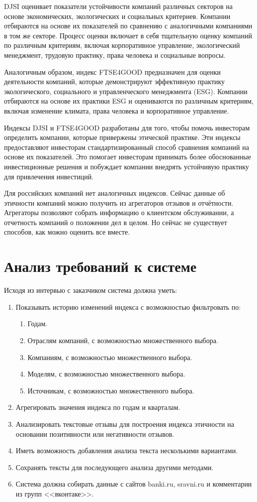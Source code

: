 \documentclass[PI, VKR]{HSEUniversity}
\begin{document}
DJSI оценивает показатели устойчивости компаний различных секторов на основе экономических, экологических и социальных критериев. Компании отбираются на основе их показателей по сравнению с аналогичными компаниями в том же секторе. Процесс оценки включает в себя тщательную оценку компаний по различным критериям, включая корпоративное управление, экологический менеджмент, трудовую практику, права человека и социальные вопросы.

Аналогичным образом, индекс FTSE4GOOD предназначен для оценки деятельности компаний, которые демонстрируют эффективную практику экологического, социального и управленческого менеджмента (ESG). Компании отбираются на основе их практики ESG и оцениваются по различным критериям, включая изменение климата, права человека и корпоративное управление.

Индексы DJSI и FTSE4GOOD разработаны для того, чтобы помочь инвесторам определить компании, которые привержены этической практике. Эти индексы предоставляют инвесторам стандартизированный способ сравнения компаний на основе их показателей. Это помогает инвесторам принимать более обоснованные инвестиционные решения и побуждает компании внедрять устойчивую практику для привлечения инвестиций.

Для российских компаний нет аналогичных индексов. Сейчас данные об этичности компаний можно получить из агрегаторов отзывов и отчётности. Агрегаторы позволяют собрать информацию о клиентском обслуживании, а отчетность компаний о положении дел в целом. Но сейчас не существует способов, как можно оценить все вместе.
\section{Анализ требований к системе}
\label{sec:org003abdc}
Исходя из интервью с заказчиком система должна уметь:

\begin{enumerate}
\item Показывать историю изменений индекса с возможностью фильтровать по:
\begin{enumerate}
\item Годам.
\item Отраслям компаний, с возможностью множественного выбора.
\item Компаниям, с возможностью множественного выбора.
\item Моделям, с возможностью множественного выбора.
\item Источникам, с возможностью множественного выбора.
\end{enumerate}
\item Агрегировать значения индекса по годам и кварталам.
\item Анализировать текстовые отзывы для построения индекса этичности на основании позитивности или негативности отзывов.
\item Иметь возможность добавления анализа текста несколькими вариантами.
\item Сохранять тексты для последующего анализа другими методами.
\item Система должна собирать данные с сайтов banki.ru, sravni.ru и комментарии из групп {}<<вконтаке>>{}.
\end{enumerate}
\end{document}
